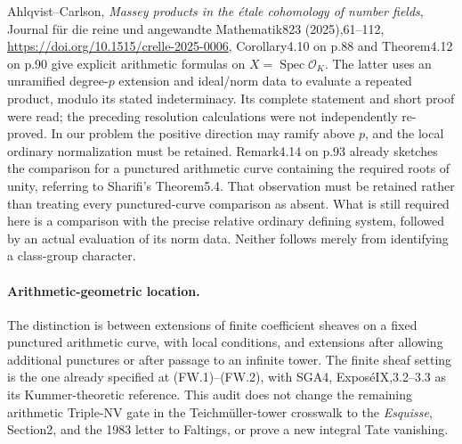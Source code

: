 Ahlqvist--Carlson, \emph{Massey products in the \'etale cohomology
of number fields}, Journal f\"ur die reine und angewandte
Mathematik823 (2025),61--112,
\url{https://doi.org/10.1515/crelle-2025-0006},
Corollary4.10 on p.88 and Theorem4.12 on p.90 give explicit
arithmetic formulas on $X=\operatorname{Spec}\mathcal O_K$.
The latter uses an unramified degree-$p$ extension and ideal/norm
data to evaluate a repeated product, modulo its stated
indeterminacy. Its complete statement and short proof were read;
the preceding resolution calculations were not independently
re-proved. In our problem the positive direction may ramify
above $p$, and the local ordinary normalization must be retained.
Remark4.14 on p.93 already sketches the comparison for a punctured
arithmetic curve containing the required roots of unity, referring
to Sharifi's Theorem5.4. That observation must be retained rather
than treating every punctured-curve comparison as absent.
What is still required here is a comparison with the precise
relative ordinary defining system, followed by an actual evaluation
of its norm data. Neither follows merely from identifying a
class-group character.

\paragraph{Arithmetic-geometric location.}
The distinction is between extensions of finite coefficient
sheaves on a fixed punctured arithmetic curve, with local
conditions, and extensions after allowing additional punctures
or after passage to an infinite tower. The finite sheaf setting
is the one already specified at (FW.1)--(FW.2), with SGA4,
Expos\'eIX,3.2--3.3 as its Kummer-theoretic reference. This audit
does not change the remaining arithmetic Triple-NV gate in the
Teichm\"uller-tower crosswalk to the \emph{Esquisse}, Section2,
and the 1983 letter to Faltings, or prove a new integral Tate vanishing.
